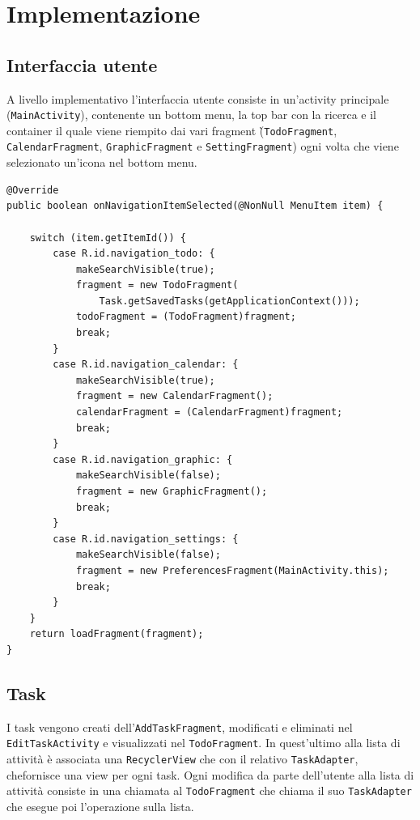 \documentclass[]{article}
\begin{document}
\hypertarget{implementazione}{%
\section{Implementazione}\label{implementazione}}

\hypertarget{interfaccia-utente}{%
\subsection{Interfaccia utente}\label{interfaccia-utente}}

A livello implementativo l'interfaccia utente consiste in un'activity
principale (\texttt{MainActivity}), contenente un bottom menu, la top
bar con la ricerca e il container il quale viene riempito dai vari
fragment (̀\texttt{TodoFragment}, \texttt{CalendarFragment},
\texttt{GraphicFragment} e \texttt{SettingFragment}) ogni volta che
viene selezionato un'icona nel bottom menu.

\begin{verbatim}
@Override
public boolean onNavigationItemSelected(@NonNull MenuItem item) {

    switch (item.getItemId()) {
        case R.id.navigation_todo: {
            makeSearchVisible(true);
            fragment = new TodoFragment(
                Task.getSavedTasks(getApplicationContext()));
            todoFragment = (TodoFragment)fragment;
            break;
        }
        case R.id.navigation_calendar: {
            makeSearchVisible(true);
            fragment = new CalendarFragment();
            calendarFragment = (CalendarFragment)fragment;
            break;
        }
        case R.id.navigation_graphic: {
            makeSearchVisible(false);
            fragment = new GraphicFragment();
            break;
        }
        case R.id.navigation_settings: {
            makeSearchVisible(false);
            fragment = new PreferencesFragment(MainActivity.this);
            break;
        }
    }
    return loadFragment(fragment);
}
\end{verbatim}

\hypertarget{task}{%
\subsection{Task}\label{task}}

I task vengono creati dell'\texttt{AddTaskFragment}, modificati e
eliminati nel \texttt{EditTaskActivity} e visualizzati nel
\texttt{TodoFragment}. In quest'ultimo alla lista di attività è
associata una \texttt{RecyclerView} che con il relativo
\texttt{TaskAdapter}, chefornisce una view per ogni task. Ogni modifica
da parte dell'utente alla lista di attività consiste in una chiamata al
\texttt{TodoFragment} che chiama il suo \texttt{TaskAdapter} che esegue
poi l'operazione sulla lista.
\end{document}
